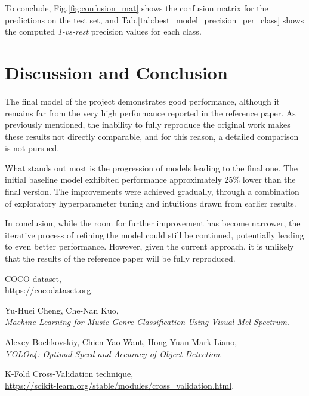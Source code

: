 \documentclass[a4paper,12pt]{article}
\begin{document}
To conclude, Fig.\ref{fig:confusion_mat} shows the confusion matrix for the predictions on the test set, and Tab.\ref{tab:best_model_precision_per_class} shows the computed \textit{1-vs-rest} precision values for each class.




\section{Discussion and Conclusion}
The final model of the project demonstrates good performance, although it remains far from the very high performance reported in the reference paper. As previously mentioned, the inability to fully reproduce the original work makes these results not directly comparable, and for this reason, a detailed comparison is not pursued.

What stands out most is the progression of models leading to the final one. The initial baseline model exhibited performance approximately 25\% lower than the final version. The improvements were achieved gradually, through a combination of exploratory hyperparameter tuning and intuitions drawn from earlier results.

In conclusion, while the room for further improvement has become narrower, the iterative process of refining the model could still be continued, potentially leading to even better performance. However, given the current approach, it is unlikely that the results of the reference paper will be fully reproduced.

\begin{thebibliography}{9}
	
	COCO dataset, \\
	\href{https://cocodataset.org}{https://cocodataset.org}.
	
	Yu-Huei Cheng, Che-Nan Kuo, \\
	\textit{Machine Learning for Music Genre Classification Using Visual Mel Spectrum}.
	
	Alexey Bochkovskiy, Chien-Yao Want, Hong-Yuan Mark Liano, \\
	\textit{YOLOv4: Optimal Speed and Accuracy of Object Detection}.
	
	K-Fold Cross-Validation technique, \\
	\href{https://scikit-learn.org/stable/modules/cross_validation.html}{https://scikit-learn.org/stable/modules/cross\_validation.html}.
	
\end{thebibliography}
\end{document}
